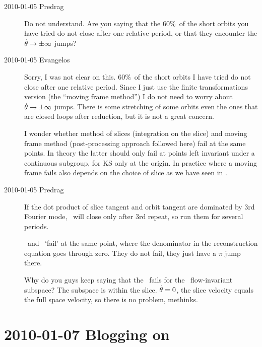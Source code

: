 \begin{description}
\item[2010-01-05 Predrag] Do not understand. Are you saying that the
60\%\ of the short orbits you have tried do not close after one relative period,
or that they encounter the $ \dot{\theta} \to \pm\infty$ jumps?

\item[2010-01-05 Evangelos] Sorry, I was not clear on this. 60\%\ of the short orbits
I have tried do not close after one relative period. Since I just use the finite
transformations version (the ``moving frame method'') I do not need to worry about
$ \dot{\theta} \to \pm\infty$ jumps. There is some stretching of some orbits even the
ones that are closed loops after reduction, but it is not a great concern.

I wonder whether method of slices (integration on the slice) and moving
frame method (post-processing approach followed here) fail at the same
points. In theory the latter should only fail at points left invariant
under a continuous subgroup, for KS only at the origin. In practice where
a moving frame fails also depends on the choice of slice as we have seen
in \cLe.

\item[2010-01-05 Predrag] If the dot product of slice tangent
and orbit tangent are dominated by 3rd Fourier mode, \rpo\
will close only after 3rd repeat, so run them for several
periods.

\Mslices\ and \mframes\ `fail' at the same point, where the
denominator in the reconstruction equation goes through zero.
They do not fail, they just have a $\pi$ jump there.

Why do you guys keep saying that the \mslices\ fails for the
\Fix{\Group}\ flow-invariant subspace? The subspace is within
the slice. $\dot{\theta}=0$, the slice velocity equals the
full space velocity, so there is no problem, methinks.

\end{description}

\section{2010-01-07 Blogging on}

